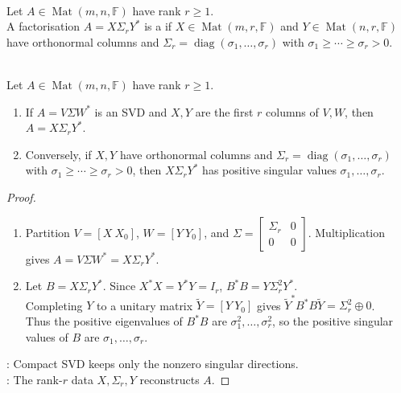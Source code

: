 \begin{definition} \label{def:compact-singular-value-decomposition} \\
Let $A\in\operatorname{Mat}(m,n,\mathbb{F})$ have rank $r\geq1$.\\
A factorisation $A=X\Sigma_rY^*$ is a  if $X\in\operatorname{Mat}(m,r,\mathbb{F})$ and $Y\in\operatorname{Mat}(n,r,\mathbb{F})$ have orthonormal columns and $\Sigma_r=\operatorname{diag}(\sigma_1,\ldots,\sigma_r)$ with $\sigma_1\geq\cdots\geq\sigma_r>0$.
\end{definition}

\begin{theorem} \label{thm:compact-singular-value-decomposition} \\
Let $A\in\operatorname{Mat}(m,n,\mathbb{F})$ have rank $r\geq1$.
\begin{enumerate}[label=(\roman*)]
\setlength{\itemsep}{0pt}
\item If $A=V\Sigma W^*$ is an SVD and $X,Y$ are the first $r$ columns of $V,W$, then $A=X\Sigma_rY^*$.
\item Conversely, if $X,Y$ have orthonormal columns and $\Sigma_r=\operatorname{diag}(\sigma_1,\ldots,\sigma_r)$ with $\sigma_1\geq\cdots\geq\sigma_r>0$, then $X\Sigma_rY^*$ has positive singular values $\sigma_1,\ldots,\sigma_r$.
\end{enumerate}
\begin{proof}
\begin{enumerate}[label=(\roman*)]
\setlength{\itemsep}{0pt}
\item Partition $V=[X\ X_0]$, $W=[Y\ Y_0]$, and $\Sigma=
\begin{bmatrix}
\Sigma_r & 0\\
0 & 0
\end{bmatrix}$. Multiplication gives $A=V\Sigma W^*=X\Sigma_rY^*$.
\item Let $B=X\Sigma_rY^*$. Since $X^{*}X=Y^{*}Y=I_r$, $B^{*}B=Y\Sigma_r^{2}Y^{*}$.\\
Completing $Y$ to a unitary matrix $\widetilde{Y}=[Y\ Y_0]$ gives $\widetilde{Y}^*B^*B\widetilde{Y}=\Sigma_r^2\oplus0$.\\
Thus the positive eigenvalues of $B^*B$ are $\sigma_1^2,\ldots,\sigma_r^2$, so the positive singular values of $B$ are $\sigma_1,\ldots,\sigma_r$.
\end{enumerate}
: Compact SVD keeps only the nonzero singular directions.\\
: The rank-$r$ data $X,\Sigma_r,Y$ reconstructs $A$.
\end{proof}
\end{theorem}

